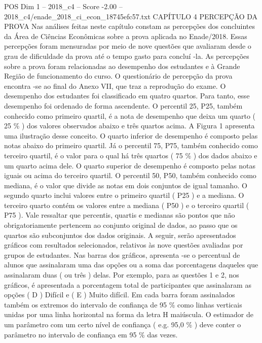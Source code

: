 \begin{textsample}{POS Dim 1 – 2018\_c4 – Score -2.00 – 2018\_c4/enade\_2018\_ci\_econ\_18745efc57.txt}  \label{ex:f1_pos_301}
CAPÍTULO 4 PERCEPÇÃO DA PROVA Nas análises feitas neste capítulo constam as percepções dos concluintes da Área de Ciências Econômicas sobre a prova aplicada no Enade/2018.
Essas percepções foram mensuradas por meio de nove questões que avaliaram desde o grau de dificuldade da prova até o tempo gasto para concluí -la.
As percepções sobre a prova foram relacionadas ao desempenho dos estudantes e à Grande Região de funcionamento do curso.
O questionário de percepção da prova encontra -se ao final do Anexo VII, que traz a reprodução do exame.
O desempenho dos estudantes foi classificado em quatro quartos.
Para tanto, esse desempenho foi ordenado de forma ascendente.
O percentil 25, P25, também conhecido como primeiro quartil, é a nota de desempenho que deixa um quarto ( 25 \% ) dos valores observados abaixo e três quartos acima.
A Figura 1 apresenta uma ilustração desse conceito.
O quarto inferior de desempenho é composto pelas notas abaixo do primeiro quartil.
Já o percentil 75, P75, também conhecido como terceiro quartil, é o valor para o qual há três quartos ( 75 \% ) dos dados abaixo e um quarto acima dele.
O quarto superior de desempenho é composto pelas notas iguais ou acima do terceiro quartil.
O percentil 50, P50, também conhecido como mediana, é o valor que divide as notas em dois conjuntos de igual tamanho.
O segundo quarto inclui valores entre o primeiro quartil ( P25 ) e a mediana.
O terceiro quarto contém os valores entre a mediana ( P50 ) e o terceiro quartil ( P75 ).
Vale ressaltar que percentis, quartis e medianas são pontos que não obrigatoriamente pertencem ao conjunto original de dados, ao passo que os quartos são subconjuntos dos dados originais.
A seguir, serão apresentados gráficos com resultados selecionados, relativos às nove questões avaliadas por grupos de estudantes.
Nas barras dos gráficos, apresenta -se o percentual de alunos que assinalaram uma das opções ou a soma das porcentagens daqueles que assinalaram duas ( ou três ) delas.
Por exemplo, para as questões 1 e 2, nos gráficos, é apresentada a porcentagem total de participantes que assinalaram as opções ( D ) Difícil e ( E ) Muito difícil.
Em cada barra foram assinalados também os extremos do intervalo de confiança de 95 \% como linhas verticais unidas por uma linha horizontal na forma da letra H maiúscula.
O estimador de um parâmetro com um certo nível de confiança ( e.g. 95,0 \% ) deve conter o parâmetro no intervalo de confiança em 95 \% das vezes.

\end{textsample}
